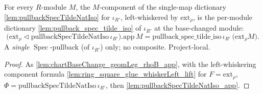 \begin{lemma}
  \label{lem:chartBaseChange_geomLeg_iotaRPrime_app}
  For every \(R\)-module \(M\), the \(M\)-component of the single-map dictionary
  \cref{lem:pullbackSpecTildeNatIso} for \(\iota_{R'}\), left-whiskered by \(\mathrm{ext}_{\rho}\), is the
  per-module dictionary \cref{lem:pullback_spec_tilde_iso} of \(\iota_{R'}\) at the base-changed module:
  \[
    \bigl(\mathrm{ext}_{\rho} \lhd \mathrm{pullbackSpecTildeNatIso}\,\iota_{R'}\bigr).\mathrm{app}\,M
      = \mathrm{pullback\_spec\_tilde\_iso}\,\iota_{R'}\,\bigl(\mathrm{ext}_{\rho} M\bigr).
  \]
  A \emph{single} \(\operatorname{Spec}\)-pullback (of \(\iota_{R'}\)) only; no composite. Project-local.
  \begin{proof}
    As \cref{lem:chartBaseChange_geomLeg_rhoB_app}, with the left-whiskering component formula
    \cref{lem:ring_square_glue_whiskerLeft_lift} for \(F = \mathrm{ext}_{\rho}\),
    \(\Phi = \mathrm{pullbackSpecTildeNatIso}\,\iota_{R'}\), then
    \cref{lem:pullbackSpecTildeNatIso_app}.
  \end{proof}
\end{lemma}

